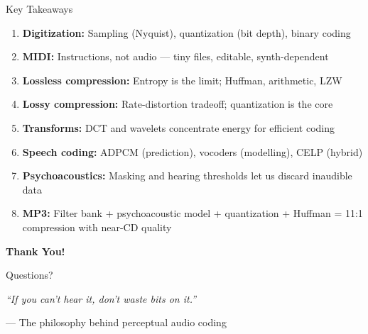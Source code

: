 \documentclass[aspectratio=169,12pt]{beamer}
\begin{document}
\begin{frame}{Key Takeaways}
    \begin{enumerate}
        \item \textbf{Digitization:} Sampling (Nyquist), quantization (bit depth), binary coding
        
        \item \textbf{MIDI:} Instructions, not audio --- tiny files, editable, synth-dependent
        
        \item \textbf{Lossless compression:} Entropy is the limit; Huffman, arithmetic, LZW
        
        \item \textbf{Lossy compression:} Rate-distortion tradeoff; quantization is the core
        
        \item \textbf{Transforms:} DCT and wavelets concentrate energy for efficient coding
        
        \item \textbf{Speech coding:} ADPCM (prediction), vocoders (modelling), CELP (hybrid)
        
        \item \textbf{Psychoacoustics:} Masking and hearing thresholds let us discard inaudible data
        
        \item \textbf{MP3:} Filter bank + psychoacoustic model + quantization + Huffman = 11:1 compression with near-CD quality
    \end{enumerate}
\end{frame}

\begin{frame}
    \begin{center}
        \Huge{\textbf{Thank You!}}
        
        \vspace{1cm}
        \Large{Questions?}
        
        \vspace{1.5cm}
        \normalsize
        \textit{``If you can't hear it, don't waste bits on it.''}
        
        \vspace{0.3cm}
        --- The philosophy behind perceptual audio coding
    \end{center}
\end{frame}
\end{document}
